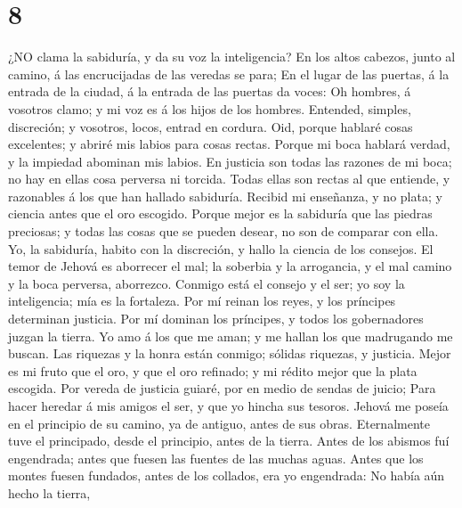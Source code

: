 \hypertarget{section-7}{%
\section{8}\label{section-7}}

 ¿NO clama la sabiduría, y da su voz la inteligencia?
 En los altos cabezos, junto al camino, á las encrucijadas
de las veredas se para;  En el lugar de las puertas, á la
entrada de la ciudad, á la entrada de las puertas da voces: 
Oh hombres, á vosotros clamo; y mi voz es á los hijos de los hombres.
 Entended, simples, discreción; y vosotros, locos, entrad en
cordura.  Oid, porque hablaré cosas excelentes; y abriré mis
labios para cosas rectas.  Porque mi boca hablará verdad, y
la impiedad abominan mis labios.  En justicia son todas las
razones de mi boca; no hay en ellas cosa perversa ni torcida.
 Todas ellas son rectas al que entiende, y razonables á los
que han hallado sabiduría.  Recibid mi enseñanza, y no
plata; y ciencia antes que el oro escogido.  Porque mejor
es la sabiduría que las piedras preciosas; y todas las cosas que se
pueden desear, no son de comparar con ella.  Yo, la
sabiduría, habito con la discreción, y hallo la ciencia de los consejos.
 El temor de Jehová es aborrecer el mal; la soberbia y la
arrogancia, y el mal camino y la boca perversa, aborrezco. 
Conmigo está el consejo y el ser; yo soy la inteligencia; mía es la
fortaleza.  Por mí reinan los reyes, y los príncipes
determinan justicia.  Por mí dominan los príncipes, y todos
los gobernadores juzgan la tierra.  Yo amo á los que me
aman; y me hallan los que madrugando me buscan.  Las
riquezas y la honra están conmigo; sólidas riquezas, y justicia.
 Mejor es mi fruto que el oro, y que el oro refinado; y mi
rédito mejor que la plata escogida.  Por vereda de justicia
guiaré, por en medio de sendas de juicio;  Para hacer
heredar á mis amigos el ser, y que yo hincha sus tesoros. 
Jehová me poseía en el principio de su camino, ya de antiguo, antes de
sus obras.  Eternalmente tuve el principado, desde el
principio, antes de la tierra.  Antes de los abismos fuí
engendrada; antes que fuesen las fuentes de las muchas aguas.
 Antes que los montes fuesen fundados, antes de los
collados, era yo engendrada:  No había aún hecho la tierra,
